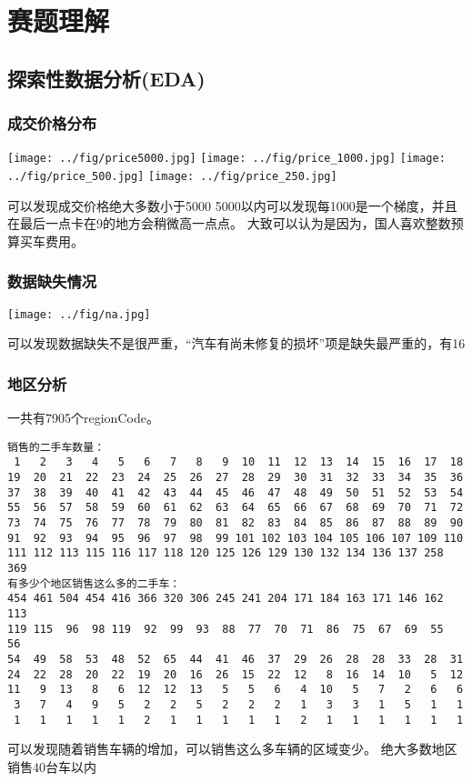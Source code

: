 \documentclass{article}
\begin{document}
	\section{赛题理解}
	\subsection{探索性数据分析(EDA)}
	\subsubsection{成交价格分布}
	\begin{center}
		\texttt{[image: ../fig/price5000.jpg]}
		\texttt{[image: ../fig/price\_1000.jpg]}
		\texttt{[image: ../fig/price\_500.jpg]}
		\texttt{[image: ../fig/price\_250.jpg]}
	\end{center}
	可以发现成交价格绝大多数小于5000
	5000以内可以发现每1000是一个梯度，并且在最后一点卡在9的地方会稍微高一点点。 大致可以认为是因为，国人喜欢整数预算买车费用。
	\subsubsection{数据缺失情况}
	\begin{center}
		\texttt{[image: ../fig/na.jpg]}
	\end{center}
	可以发现数据缺失不是很严重，“汽车有尚未修复的损坏”项是缺失最严重的，有16%
	\subsubsection{地区分析}
	一共有7905个regionCode。\par 
	\begin{verbatim}
销售的二手车数量：
 1   2   3   4   5   6   7   8   9  10  11  12  13  14  15  16  17  18
19  20  21  22  23  24  25  26  27  28  29  30  31  32  33  34  35  36
37  38  39  40  41  42  43  44  45  46  47  48  49  50  51  52  53  54
55  56  57  58  59  60  61  62  63  64  65  66  67  68  69  70  71  72
73  74  75  76  77  78  79  80  81  82  83  84  85  86  87  88  89  90
91  92  93  94  95  96  97  98  99 101 102 103 104 105 106 107 109 110
111 112 113 115 116 117 118 120 125 126 129 130 132 134 136 137 258 369
有多少个地区销售这么多的二手车：
454 461 504 454 416 366 320 306 245 241 204 171 184 163 171 146 162 113
119 115  96  98 119  92  99  93  88  77  70  71  86  75  67  69  55  56
54  49  58  53  48  52  65  44  41  46  37  29  26  28  28  33  28  31
24  22  28  20  22  19  20  16  26  15  22  12   8  16  14  10   5  12
11   9  13   8   6  12  12  13   5   5   6   4  10   5   7   2   6   6
 3   7   4   9   5   2   2   5   2   2   2   1   3   3   1   5   1   1
 1   1   1   1   1   2   1   1   1   1   1   2   1   1   1   1   1   1
	\end{verbatim}
	可以发现随着销售车辆的增加，可以销售这么多车辆的区域变少。 绝大多数地区销售40台车以内
\end{document}
